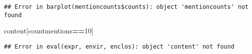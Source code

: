 \documentclass[]{article}
\newenvironment{Shaded}{\begin{snugshade}}{\end{snugshade}}
\newcommand{\DecValTok}[1]{\textcolor[rgb]{0.00,0.00,0.81}{#1}}
\newcommand{\OperatorTok}[1]{\textcolor[rgb]{0.81,0.36,0.00}{\textbf{#1}}}
\newcommand{\NormalTok}[1]{#1}
\begin{document}
\begin{verbatim}
## Error in barplot(mentioncounts$counts): object 'mentioncounts' not found
\end{verbatim}

\begin{Shaded}
\begin{Highlighting}[]
\NormalTok{content[countmentions}\OperatorTok{==}\DecValTok{10}\NormalTok{]}
\end{Highlighting}
\end{Shaded}

\begin{verbatim}
## Error in eval(expr, envir, enclos): object 'content' not found
\end{verbatim}
\end{document}
